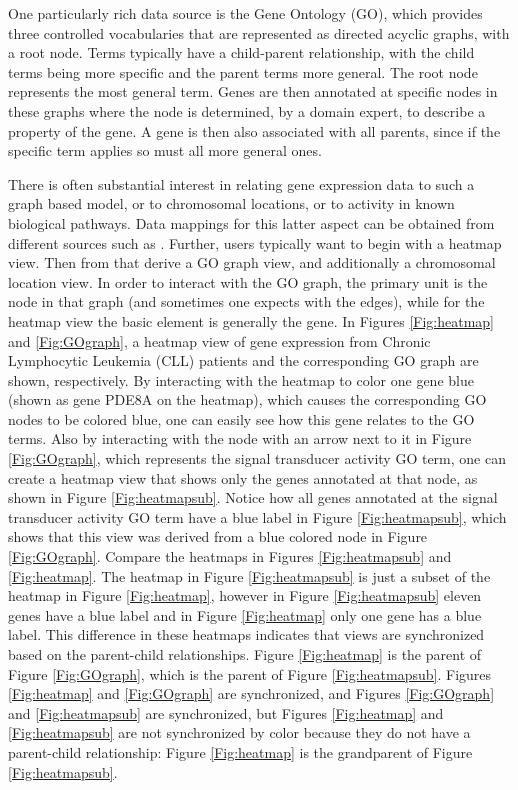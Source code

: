 \documentclass[11pt]{article}
\begin{document}
One particularly rich data source is the Gene Ontology (GO), \cite{GO}
which provides three controlled vocabularies that are represented as
directed acyclic graphs, with a root node. Terms typically have a
child-parent relationship, with the child terms being more specific
and the parent terms more general. The root node represents the most
general term. Genes are then annotated at specific nodes in these
graphs where the node is determined, by a domain expert, to describe a
property of the gene. A gene is then also associated with all parents,
since if the specific term applies so must all more general ones.

There is often substantial interest in relating gene expression data
to such a graph based model, or to chromosomal locations, or to
activity in known biological pathways. Data mappings for this latter
aspect can be obtained from different sources such as \cite{KEGG}.
Further, users typically want to begin with a heatmap view. Then from
that derive a GO graph view, and additionally a chromosomal location
view. In order to interact with the GO graph, the primary unit is the
node in that graph (and sometimes one expects with the edges), while
for the heatmap view the basic element is generally the gene.  In Figures
\ref{Fig:heatmap} and \ref{Fig:GOgraph}, a heatmap view of gene expression
from Chronic Lymphocytic Leukemia (CLL) patients and the corresponding GO
graph are shown, respectively.  By interacting with the heatmap to color one
gene blue (shown as gene PDE8A on the heatmap), which causes the corresponding
GO nodes to be colored blue, one can easily see how this gene relates to the
GO terms.  Also by interacting with the node with an arrow next to it in
Figure \ref{Fig:GOgraph}, which represents the signal transducer activity GO
term, one can create a heatmap view that shows only the genes annotated at
that node, as shown in Figure \ref{Fig:heatmapsub}.  Notice how all genes
annotated at the signal transducer activity GO term have a blue label in
Figure \ref{Fig:heatmapsub}, which shows that this view was derived from a
blue colored node in Figure \ref{Fig:GOgraph}.  Compare the heatmaps in
Figures \ref{Fig:heatmapsub} and \ref{Fig:heatmap}.  The heatmap in Figure
\ref{Fig:heatmapsub} is just a subset of the heatmap in Figure
\ref{Fig:heatmap}, however in Figure \ref{Fig:heatmapsub} eleven genes have a
blue label and in Figure \ref{Fig:heatmap} only one gene has a blue label.
This difference in these heatmaps indicates that views are synchronized based
on the parent-child relationships.  Figure \ref{Fig:heatmap} is the parent of
Figure \ref{Fig:GOgraph}, which is the parent of Figure \ref{Fig:heatmapsub}.
Figures \ref{Fig:heatmap} and \ref{Fig:GOgraph} are synchronized, and Figures
\ref{Fig:GOgraph} and \ref{Fig:heatmapsub} are synchronized, but Figures
\ref{Fig:heatmap} and \ref{Fig:heatmapsub} are not synchronized by color
because they do not have a parent-child relationship: Figure \ref{Fig:heatmap}
is the grandparent of Figure \ref{Fig:heatmapsub}.
\end{document}
